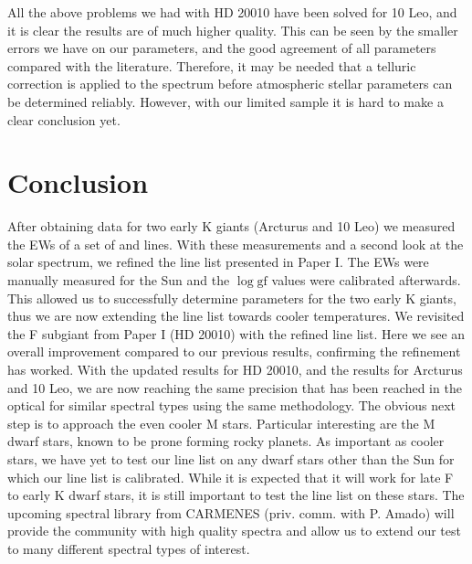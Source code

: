 \documentclass{aa}
\begin{document}
All the above problems we had with HD 20010 have been solved for 10 Leo, and it
is clear the results are of much higher quality. This can be seen by the smaller
errors we have on our parameters, and the good agreement of all parameters
compared with the literature. Therefore, it may be needed that a telluric
correction is applied to the spectrum before atmospheric stellar parameters can
be determined reliably. However, with our limited sample it is hard to make a
clear conclusion yet.



\section{Conclusion}
\label{sec:conclusion}

After obtaining data for two early K giants (Arcturus and 10 Leo) we measured
the EWs of a set of  and  lines. With these measurements
and a second look at the solar spectrum, we refined the line list presented in
Paper I. The EWs were manually measured for the Sun and the $\log \mathrm{gf}$
values were calibrated afterwards. This allowed us to successfully determine
parameters for the two early K giants, thus we are now extending the line list
towards cooler temperatures. We revisited the F subgiant from Paper I (HD 20010)
with the refined line list. Here we see an overall improvement compared to our
previous results, confirming the refinement has worked. With the updated results
for HD 20010, and the results for Arcturus and 10 Leo, we are now reaching the
same precision that has been reached in the optical for similar spectral types
using the same methodology. The obvious next step is to approach the even cooler
M stars. Particular interesting are the M dwarf stars, known to be prone forming
rocky planets.  As important as cooler stars, we have yet to test our line list
on any dwarf stars other than the Sun for which our line list is calibrated.
While it is expected that it will work for late F to early K dwarf stars, it is
still important to test the line list on these stars. The upcoming spectral
library from CARMENES (priv. comm. with P. Amado) will provide the community
with high quality spectra and allow us to extend our test to many different
spectral types of interest.
\end{document}

